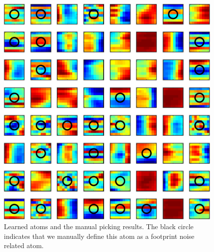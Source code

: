 \begin{figure}[htb!]
\centering
\includegraphics[width=\columnwidth]{Fig/sta_atoms2}
\caption{Learned atoms and the manual picking results. The black circle indicates that we manually define this atom as a footprint noise related atom. }
\label{fig:sta_atoms2}
\end{figure}


